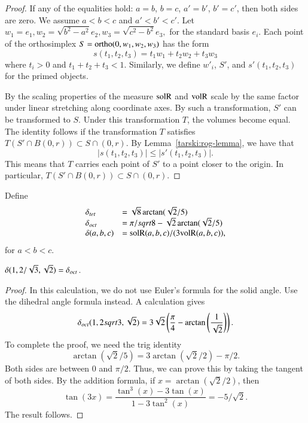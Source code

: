 \begin{proof} If any of the equalities hold: $a=b$, $b=c$, $a'=b'$,
$b'=c'$, then both sides are zero.  We assume $a<b<c$ and $a'<b'<c'$.
Let $w_1=e_1,w_2=\sqrt{b^2-a^2} e_2,w_3=\sqrt{c^2-b^2} e_3,$
for the standard basis $e_i$.  Each point of the orthosimplex
$S = {\operatorname{ortho}}(0,w_1,w_2,w_3)$ has
the form
   $$s(t_1,t_2,t_3) = t_1 w_1 + t_2 w_2 + t_3 w_3$$
where $t_i>0$ and $t_1+t_2+t_3< 1$.  Similarly,
we define $w'_i$, $S'$, and $s'(t_1,t_2,t_3)$ for the primed objects.

By the scaling properties of the measure ${\operatorname{solR}}$ and ${\operatorname{volR}}$
scale by the same factor under linear stretching along coordinate axes.
By such a transformation, $S'$ can be transformed to $S$.
Under this transformation $T$, the volumes become equal.
The identity follows if the transformation $T$ satisfies
   $T(S'\cap B(0,r))\subset S\cap (0,r)$.
By Lemma~\ref{tarski:rog-lemma}, we have that 
   $$|s(t_1,t_2,t_3)|\le |s'(t_1,t_2,t_3)|.$$
This means that $T$ carries each point of $S'$ to a point closer to
the origin.  In particular,
  $T(S'\cap B(0,r))\subset S\cap (0,r)$.
\end{proof}

\begin{definition}  Define 
  $$
  \begin{array}{lll}
  \delta_{tet} &= \sqrt8 \arctan(\sqrt2/5)\\
  \delta_{oct} &= \pi/sqrt8 - \sqrt2 \arctan(\sqrt2/5)\\
  \delta(a,b,c)&= {\operatorname{solR}}(a,b,c)/(3{\operatorname{volR}}(a,b,c)),
  \end{array}
  $$
for $a<b<c$.  
\end{definition}

\begin{lemma}\label{lemma:doct-calc}
  $\delta(1,2/\sqrt{3},\sqrt2)=\delta_{oct}$.
\end{lemma}

\begin{proof}  In this calculation, we do not use Euler's formula
for the solid angle.  Use the dihedral angle formula instead.
A calculation gives
  $$
  \delta_{oct}(1,2\/sqrt{3},\sqrt2)=
  3 \sqrt{2} \left(\frac{\pi }{4}-\arctan
   \left(\frac{1}{\sqrt{2}}\right)\right).$$
To complete the proof, we need the trig identity
  $$\arctan(\sqrt2/5)  = 3\arctan(\sqrt2/2)-\pi/2.$$
Both sides are between $0$ and $\pi/2$.  Thus, we can prove this
by taking the tangent of both sides. By the addition formula,
if $x=\arctan(\sqrt2/2)$, then
   $$\tan(3 x) = \frac{\tan^3(x) - 3\tan(x)}{1-3 \tan^2(x)} = -5/\sqrt2.$$
The result follows.
\end{proof}


